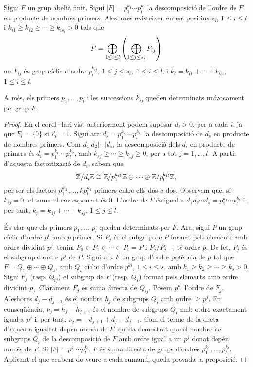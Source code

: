 \documentclass[../main.tex]{subfiles}
\begin{document}
\begin{prop}\label{prop:proposicioproposicio}
Sigui $F$ un grup abelià finit. Sigui $|F| = p_1^{k_1}\cdots p_l^{k_l}$ la descomposició de l'ordre de $F$ en producte de nombres primers. Aleshores existeixen enters positius $s_i$, $1\leq i \leq l$ i $k_{i1}\geq k_{i2}\geq \cdots\geq k_{is_i}>0$ tals que 
\begin{equation}
    \notag
    F = \bigoplus_{1\leq i\leq l}\left(\bigoplus_{1\leq j\leq s_i} F_{ij}\right)
\end{equation}
on $F_{ij}$ és grup cíclic d'ordre $p_i^{k_{ij}}$, $1\leq j\leq s_i,\;1\leq i\leq l$, i $k_i = k_{i1}+\cdots+k_{is_i}$, $1\leq i\leq l$.

A més, els primers $p_1,\ldots,p_l$ i les successions $k_{ij}$ queden determinats unívocament pel grup $F$.
\end{prop}
\begin{proof}
En el corol·lari vist anteriorment podem suposar $d_i>0$, per a cada $i$, ja que $F_i = \{0\}$ si $d_i = 1$. Sigui ara $d_s = p_1^{k_{s1}}\cdots p_l^{k_{sl}}$ la descomposició de $d_s$ en producte de nombres primers. Com $d_1|d_2|\cdots|d_s$, la descomposició dels $d_i$ en producte de primers és $d_i = p_1^{k_{i1}}\cdots p_l^{k_{il}}$, amb $k_{sj}\geq\cdots\geq k_{1j}\geq 0$, per a tot $j = 1,\ldots, l$. A partir d'aquesta factorització de $d_i$, sabem que
\begin{equation}
    \notag
    \mathbb{Z}/d_i\mathbb{Z}\cong \mathbb{Z}/p_1^{k_{i1}}\mathbb{Z}\oplus\cdots\oplus\mathbb{Z}/p_l^{k_{il}}\mathbb{Z},
\end{equation}
per ser els factors $p_1^{k_{i1}},\ldots,kp_l^{k_{il}}$ primers entre ells dos a dos. Observem que, si $k_{ij}=0$, el sumand corresponent és 0. L'ordre de $F$ és igual a $d_1d_2\cdots d_s = p_1^{k_1}\cdots p_l^{k_l}$ i, per tant, $k_j = k_{1j}+\cdots+k_{sj}$, $1\leq j\leq l$.

És clar que els primers $p_1,\ldots,p_l$ queden determinats per $F$. Ara, sigui $P$ un grup cíclic d'ordre $p^t$ amb $p$ primer. Si $P_j$ és el subgrup de $P$ format pels elements amb ordre dividint $p^j$, tenim $P_0\subset P_1\subset \cdots\subset P_t = P$ i $P_j/P_{j-1}$ té ordre $p$. De fet, $P_j$ és el subgrup d'ordre $p^j$ de $P$. Sigui ara $F$ un grup d'ordre potència de $p$ tal que $F = Q_1\oplus\cdots\oplus Q_s$, amb $Q_i$ cíclic d'ordre $p^{ki}$, $1\leq i\leq s$, amb $k_1\geq k_2\geq \cdots \geq k_s>0$. Sigui $F_j$ (resp. $Q_{ij}$) el subgrup de $F$ (resp. $Q_i$) format pels elements amb ordre dividint $p_j$. Clarament $F_j$ és suma directa de $Q_{ij}$. Posem $p^{d_j}$ l'ordre de $F_j$. Aleshores $d_j-d_{j-1}$ és el nombre $h_j$ de subgrups $Q_i$ amb ordre $\geq p^j$. En conseqüència, $\nu_j = h_j-h_{j+1}$ és el nombre de subgrups $Q_i$ amb ordre exactament igual a $p^j$ i, per tant, $\nu_j = -d_{j+1}+d_j-d_{j-1}$. Com el terme de la dreta d'aquesta igualtat depèn només  de $F$, queda demostrat que el nombre de subgrups $Q_i$ de la descomposició de $F$ amb ordre igual a un $p^j$ donat depèn només de $F$. Si $|F| = p_1^{k_1}\cdots p_l^{k_l}$, $F$ és suma directa de grups d'ordres $p_1^{k_1},\ldots,p_l^{k_l}$. Aplicant el que acabem de veure a cada sumand, queda provada la proposició.
\end{proof}
\end{document}
